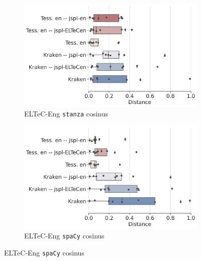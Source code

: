 \begin{figure}
 \begin{subfigure}{0.45\textwidth}
  \includegraphics[height=.65\textwidth]{IMAGES/Boite-moustache/ELTeC-Eng_stanza_cosinus.png} 
        \caption{ELTeC-Eng \texttt{stanza} cosinus}
   \end{subfigure}
    \begin{subfigure}{0.5\textwidth}
  \includegraphics[height=.65\textwidth]{IMAGES/Boite-moustache/ELTeC-Eng_spacy3.5.1_cosinus.png} 
        \caption{ELTeC-Eng \texttt{spaCy} cosinus}
   \end{subfigure}


\end{figure}
